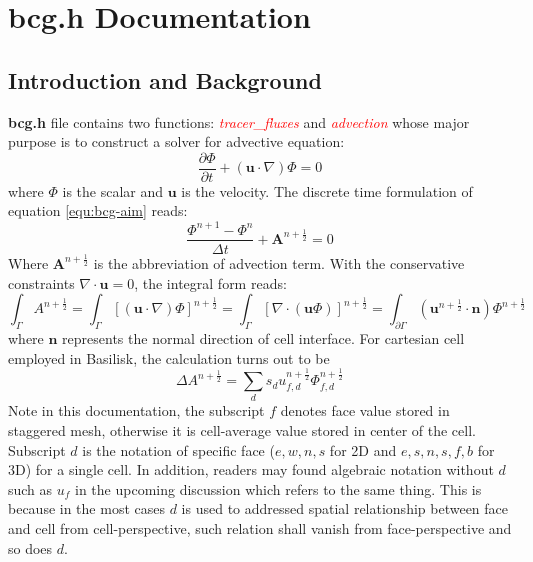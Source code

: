 \chapter{bcg.h Documentation}
\ifsingle
\maketitle
\fi
\chaptermeta[2.0][2025-06-04]

\section{Introduction and Background}\label{sec:bcg-intro}
\textbf{bcg.h} file contains two functions: \textcolor{red}{\emph{tracer\_fluxes}} and \textcolor{red}{\emph{advection}} whose major purpose is to construct a solver for advective equation:
\begin{equation}
  \frac{\partial \Phi}{\partial t} + ( \mathbf{u} \cdot \nabla)\Phi = 0\label{equ:bcg-aim}
\end{equation}
where $\Phi$ is the scalar and $ \mathbf{u}$ is the velocity. The discrete time formulation of equation \ref{equ:bcg-aim} reads:
\begin{equation}
  \frac{\Phi^{n+1}-\Phi^{n}}{\Delta t} + \mathbf{A}^{n+\frac{1}{2}} = 0 \label{equ:bcg-general}
\end{equation}
Where $ \mathbf{A}^{n+ \frac{1}{2}}$ is the abbreviation of advection term. With the conservative constraints $\nabla \cdot \mathbf{u} = 0$, the integral form reads:
\begin{equation}
  \int_{\Gamma} A^{n+ \frac{1}{2}} = \int_{\Gamma} [( \mathbf{u}\cdot \nabla)\Phi]^{n+ \frac{1}{2}} = \int_{\Gamma} [\nabla\cdot( \mathbf{u} \Phi)]^{n+ \frac{1}{2}} = \int_{\partial \Gamma} ( \mathbf{u}^{n + \frac{1}{2}} \cdot \mathbf{n}) \Phi^{n+ \frac{1}{2}}
\end{equation}
where $ \mathbf{n}$ represents the normal direction of cell interface. For cartesian cell employed in Basilisk, the calculation turns out to be
\begin{equation}
  \Delta A^{n+ \frac{1}{2}} = \sum_{d} s_d u_{f,d}^{n+ \frac{1}{2}}\Phi_{f,d}^{n + \frac{1}{2}} 
\end{equation}
Note in this documentation, the subscript $f$ denotes face value stored in staggered mesh\cite{1965_Harlow}, otherwise it is cell-average value stored in center of the cell. Subscript $d$ is the notation of specific face ($e,w,n,s$ for 2D and $e,s,n,s,f,b$ for 3D) for a single cell. In addition, readers may found algebraic notation without $d$ such as $u_f$ in the upcoming discussion which refers to the same thing. This is because in the most cases $d$ is used to addressed spatial relationship between face and cell from cell-perspective, such relation shall vanish from face-perspective and so does $d$.

